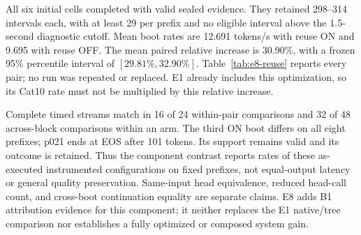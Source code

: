 All six initial cells completed with valid sealed evidence. They retained 298--314 intervals each, with at least 29 per prefix and no eligible interval above the 1.5-second diagnostic cutoff. Mean boot rates are 12.691 tokens/s with reuse ON and 9.695 with reuse OFF. The mean paired relative increase is 30.90\%, with a frozen 95\% percentile interval of $[29.81\%,32.90\%]$. Table~\ref{tab:e8-reuse} reports every pair; no run was repeated or replaced. E1 already includes this optimization, so its Cat10 rate must not be multiplied by this relative increase.

Complete timed streams match in 16 of 24 within-pair comparisons and 32 of 48 across-block comparisons within an arm. The third ON boot differs on all eight prefixes; p021 ends at EOS after 101 tokens. Its support remains valid and its outcome is retained. Thus the component contrast reports rates of these as-executed instrumented configurations on fixed prefixes, not equal-output latency or general quality preservation. Same-input head equivalence, reduced head-call count, and cross-boot continuation equality are separate claims. E8 adds B1 attribution evidence for this component; it neither replaces the E1 native/tree comparison nor establishes a fully optimized or composed system gain.


